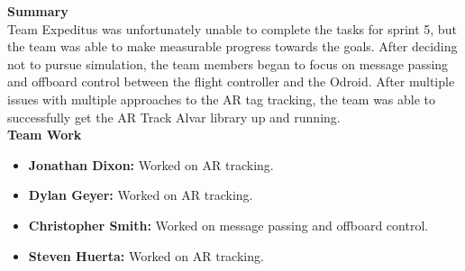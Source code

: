 \noindent \large{\textbf{Summary}}\\
\normalsize Team Expeditus was unfortunately unable to complete the tasks for sprint 5, but the team was able to make measurable progress towards the goals. After deciding not to pursue simulation, the team members began to focus on message passing and offboard control between the flight controller and the Odroid. After multiple issues with multiple approaches to the AR tag tracking, the team was able to successfully get the AR Track Alvar library up and running.
\vspace{5mm}
\\
\noindent \Large{\textbf{Team Work}}
\normalsize
\begin{itemize}
\item \textbf{Jonathan Dixon:} Worked on AR tracking.
\item \textbf{Dylan Geyer:} Worked on AR tracking.
\item \textbf{Christopher Smith:} Worked on message passing and offboard control. 
\item \textbf{Steven Huerta:} Worked on AR tracking. 
\end{itemize}

